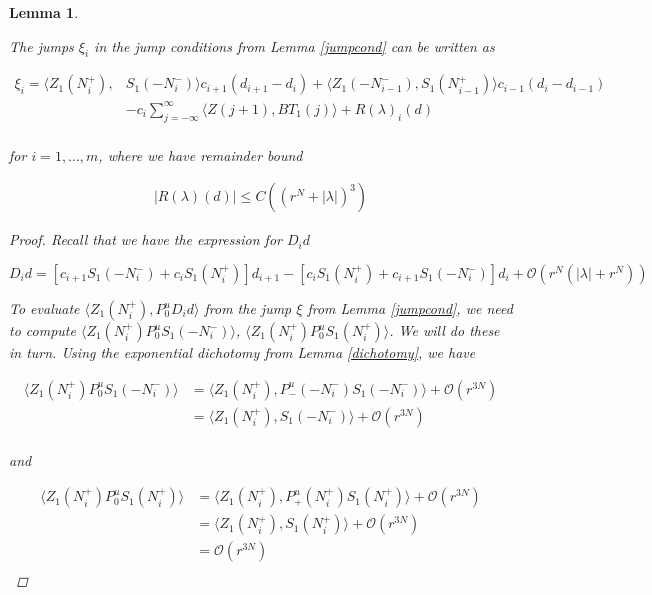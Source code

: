 \documentclass[12pt]{article}
\newtheorem{lemma}{Lemma}
\begin{document}
\begin{lemma}\label{jumpcond2}

The jumps $\xi_i$ in the jump conditions from Lemma \ref{jumpcond} can be written as

\begin{align}\label{jumps}
\xi_i = \langle Z_1(N_i^+), &S_1(-N_i^-) \rangle c_{i+1}( d_{i+1} - d_i) 
+ \langle Z_1(-N_{i-1}^-), S_1(N_{i-1}^+) \rangle c_{i-1}( d_i - d_{i-1}) \\
&- c_i \sum_{j = -\infty}^{\infty} \langle Z(j+1), B T_1(j)\rangle + R(\lambda)_i(d) \\
\end{align}

for $i = 1, \dots, m$, where we have remainder bound

\begin{align*}
|R(\lambda)(d)| \leq C\left( (r^N + |\lambda|)^3 \right)
\end{align*}

\begin{proof}
Recall that we have the expression for $D_i d$

\[
D_i d = [ c_{i+1} S_1(-N_i^-) + c_i S_1(N_i^+) ] d_{i+1}
- [ c_i S_1(N_i^+) + c_{i+1} S_1(-N_i^-) ] d_i 
+\mathcal{O}(r^N( |\lambda| + r^N))
\]

To evaluate $\langle Z_1(N_i^+), P_0^u D_i d \rangle$ from the jump $\xi$ from Lemma \ref{jumpcond}, we need to compute $\langle Z_1(N_i^+) P_0^u S_1(-N_i^-) \rangle$, $\langle Z_1(N_i^+) P_0^u S_1(N_i^+) \rangle$. We will do these in turn. Using the exponential dichotomy from Lemma \ref{dichotomy}, we have

\begin{align*}
\langle Z_1(N_i^+) P_0^u S_1(-N_i^-) \rangle
&= \langle Z_1(N_i^+), P_-^u(-N_i^-) S_1(-N_i^-) \rangle + \mathcal{O}(r^{3N}) \\
&= \langle Z_1(N_i^+), S_1(-N_i^-) \rangle + \mathcal{O}(r^{3N}) \\
\end{align*}

and

\begin{align*}
\langle Z_1(N_i^+) P_0^u S_1(N_i^+) \rangle
&= \langle Z_1(N_i^+), P_+^u(N_i^+) S_1(N_i^+) \rangle + \mathcal{O}(r^{3N}) \\
&= \langle Z_1(N_i^+), S_1(N_i^+) \rangle + \mathcal{O}(r^{3N}) \\
&= \mathcal{O}(r^{3N}) \\
\end{align*}


\end{proof}
\end{lemma}
\end{document}
